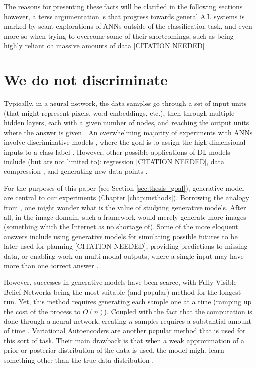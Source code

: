 \documentclass[a4paper]{book}
\begin{document}
The reasons for presenting these facts will be clarified in the following sections however, a terse argumentation is that progress towards general A.I. systems is marked by scant explorations of ANNs outside of the classification task, and even more so when trying to overcome some of their shortcomings, such as being highly reliant on massive amounts of data [CITATION NEEDED].

\section{We do not discriminate}\label{sec:no_disc}

Typically, in a neural network, the data samples go through a set of input units (that might represent pixels, word embeddings, etc.), then through multiple hidden layers, each with a given number of nodes, and reaching the output units where the answer is given \parencite{marcus_deep_2018}. An overwhelming majority of experiments with ANNs involve discriminative models \parencite{goodfellow_generative_2014}, where the goal is to assign the high-dimensional inputs to a class label \parencite[such as an animal or piece of furniture;][]{zhang_character-level_2015, krizhevsky_imagenet_2012}. However, other possible applications of DL models include (but are not limited to): regression [CITATION NEEDED], data compression \parencite{cheng_deep_2018}, and generating new data points \parencite{graves_generating_2013}.

For the purposes of this paper (see Section \ref{sec:thesis_goal}), generative model are central to our experiments (Chapter \ref{chap:methods}). Borrowing the analogy from \textcite{goodfellow_nips_2016}, one might wonder what is the value of studying generative models. After all, in the image domain, such a framework would merely generate more images (something which the Internet as no shortage of). Some of the more eloquent answers include using generative models for simulating possible futures to be later used for planning [CITATION NEEDED], providing predictions to missing data, or enabling work on multi-modal outputs, where a single input may have more than one correct answer \parencite{goodfellow_nips_2016}.

However, successes in generative models have been scarce, with Fully Visible Belief Networks \parencite{frey_does_1996} being the most suitable (and popular) method for the longest run. Yet, this method requires generating each sample one at a time (ramping up the cost of the process to $O(n)$). Coupled with the fact that the computation is done through a neural network, creating $n$ samples requires a substantial amount of time \parencite{goodfellow_nips_2016}. Variational Autoencoders \parencite{kingma_auto-encoding_2013} are another popular method that is used for this sort of task. Their main drawback is that when a weak approximation of a prior or posterior distribution of the data is used, the model might learn something other than the true data distribution \parencite{goodfellow_nips_2016}.
\end{document}
